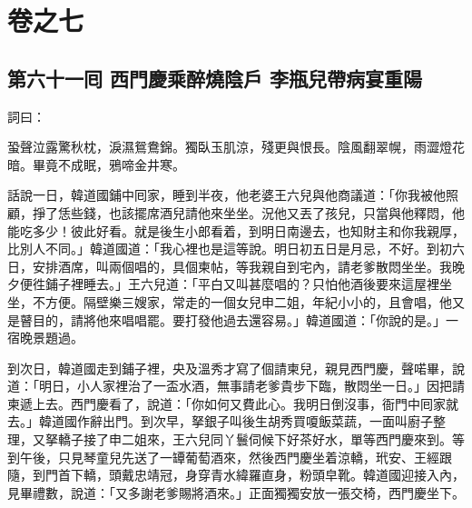\part*{{\titlename}卷之七}



\chapter*{第六十一囘 西門慶乘醉燒陰戶 李瓶兒帶病宴重陽}


詞曰：

\begin{myquote}
蛩聲泣露驚秋枕，淚濕鴛鴦錦。獨臥玉肌涼，殘更與恨長。陰風翻翠幌，雨澀燈花暗。畢竟不成眠，鴉啼金井寒。

\end{myquote}

話說一日，韓道國鋪中囘家，睡到半夜，他老婆王六兒與他商議道：「你我被他照顧，{}掙了恁些錢，也該擺席酒兒請他來坐坐。況他又丟了孩兒，只當與他釋悶，他能吃多少！彼此好看。就是後生小郎看着，{}到明日南邊去，也知財主和你我親厚，比別人不同。」韓道國道：「我心裡也是這等說。明日初五日是月忌，不好。到初六日，安排酒席，叫兩個唱的，具個柬帖，等我親自到宅內，請老爹散悶坐坐。我晚夕便徃鋪子裡睡去。」{}王六兒道：「平白又叫甚麼唱的？只怕他酒後要來這屋裡坐坐，不方便。隔壁樂三嫂家，常走的一個女兒申二姐，年紀小小的，且會唱，他又是瞽目的，請將他來唱唱罷。要打發他過去還容易。」韓道國道：「你說的是。」{}一宿晚景題過。

到次日，韓道國走到鋪子裡，央及溫秀才寫了個請柬兒，親見西門慶，聲喏畢，說道：「明日，小人家裡治了一盃水酒，無事請老爹貴步下臨，散悶坐一日。」因把請柬遞上去。西門慶看了，說道：「你如何又費此心。我明日倒沒事，衙門中囘家就去。」韓道國作辭出門。到次早，拏銀子叫後生胡秀買嗄飯菜蔬，一面叫廚子整理，又拏轎子接了申二姐來，王六兒同丫鬟伺候下好茶好水，單等西門慶來到。等到午後，只見琴童兒先送了一罈葡萄酒來，{}然後西門慶坐着涼轎，玳安、王經跟隨，到門首下轎，頭戴忠靖冠，身穿青水緯羅直身，粉頭皁靴。韓道國迎接入內，見畢禮數，說道：「又多謝老爹賜將酒來。」正面獨獨安放一張交椅，西門慶坐下。

